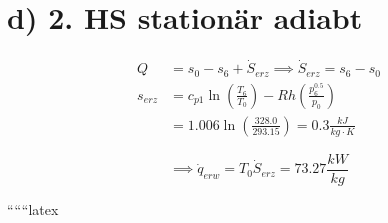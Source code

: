 \section*{d) 2. HS stationär adiabt}

\begin{align*}
Q &= s_0 - s_6 + \dot{S}_{erz} \implies \dot{S}_{erz} = s_6 - s_0 \\
s_{erz} &= c_{p1} \ln \left( \frac{T_6}{T_0} \right) - R h \left( \frac{p_6^{0.5}}{p_0} \right) \\
&= 1.006 \ln \left( \frac{328.0}{293.15} \right) = 0.3 \frac{kJ}{kg \cdot K}
\end{align*}

\[
\implies \dot{q}_{erw} = T_0 \dot{S}_{erz} = 73.27 \frac{kW}{kg}
\]

``````latex